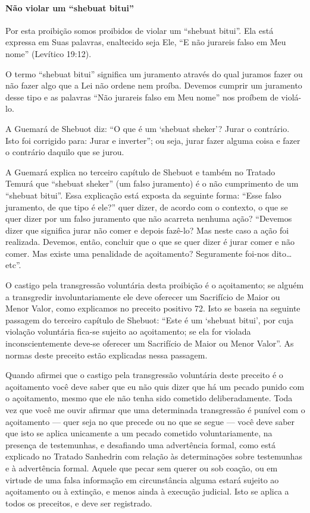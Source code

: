 \paragraph{Não violar um ``shebuat bitui''}

Por esta proibição somos proibidos de violar um ``shebuat bitui''. Ela
está expressa em Suas palavras, enaltecido seja Ele, ``E não jurareis
falso em Meu nome'' (Levítico 19:12).

O termo ``shebuat bitui'' significa um juramento através do qual juramos
fazer ou não fazer algo que a Lei não ordene nem proíba. Devemos
cumprir um juramento desse tipo e as palavras ``Não jurareis falso em
Meu nome'' nos proíbem de violá-lo.

A Guemará de Shebuot diz: ``O que é um `shebuat sheker'? Jurar o
contrário. Isto foi corrigido para: Jurar e inverter''; ou seja, jurar
fazer alguma coisa e fazer o contrário daquilo que se jurou.

A Guemará explica no terceiro capítulo de Shebuot e também no Tratado
Temurá que ``shebuat sheker'' (um falso juramento) é o não cumprimento
de um ``shebuat bitui''. Essa explicação está exposta da seguinte forma:
``Esse falso juramento, de que tipo é ele?'' quer dizer, de acordo com o
contexto, o que se quer dizer por um falso juramento que não acarreta
nenhuma ação? ``Devemos dizer que significa jurar não comer e depois
fazê-lo? Mas neste caso a ação foi realizada. Devemos, então, concluir
que o que se quer dizer é jurar comer e não comer. Mas existe uma
penalidade de açoitamento? Seguramente foi-nos dito\ldots{} etc''.

O castigo pela transgressão voluntária desta proibição é o açoitamento; se alguém a transgredir involuntariamente ele deve oferecer um
Sacrifício de Maior ou Menor Valor, como explicamos no preceito
positivo 72. Isto se baseia na seguinte passagem do terceiro capítulo de
Shebuot: ``Este é um `shebuat bitui', por cuja violação voluntária
fica-se sujeito ao açoitamento; se ela for violada inconscientemente
deve-se oferecer um Sacrifício de Maior ou Menor Valor''. As normas
deste preceito estão explicadas nessa passagem.

Quando afirmei que o castigo pela transgressão voluntária deste preceito
é o açoitamento você deve saber que eu não quis dizer que há um pecado
punido com o açoitamento, mesmo que ele não tenha sido cometido
deliberadamente. Toda vez que você me ouvir afirmar que uma determinada
transgressão é punível com o açoitamento --- quer seja no que precede
ou no que se segue --- você deve saber que isto se aplica unicamente a
um pecado cometido voluntariamente, na presença de testemunhas, e
desafiando uma advertência formal, como está explicado no Tratado
Sanhedrin com relação às determinações sobre testemunhas e à
advertência formal. Aquele que pecar sem querer ou sob coação, ou em
virtude de uma falsa informação em circunstância alguma estará sujeito
ao açoitamento ou à extinção, e menos ainda à execução judicial. Isto
se aplica a todos os preceitos, e deve ser registrado.

